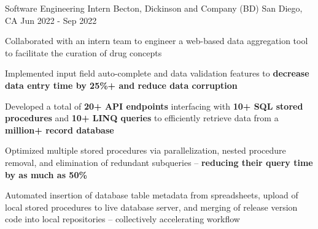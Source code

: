 

\begin{cventries}

  \cventry
  {Software Engineering Intern} %
  {Becton, Dickinson and Company (BD)} %
  {San Diego, CA} %
  {Jun 2022 - Sep 2022} %
  {\begin{cvitems} %
      \item {Collaborated with an intern team to engineer a web-based data aggregation tool to facilitate the curation of drug concepts}
      \item { Implemented input field auto-complete and data validation features to \textbf{decrease data entry time by 25\%+ and reduce data corruption} }
      \item {Developed a total of \textbf{20+ API endpoints} interfacing with \textbf{10+ SQL stored procedures} and \textbf{10+ LINQ queries} to efficiently retrieve data from a \textbf{million+ record database}}
      \item {Optimized multiple stored procedures via parallelization, nested procedure removal, and elimination of redundant subqueries -- \textbf{reducing their query time by as much as 50\%}}
      \item {Automated insertion of database table metadata from spreadsheets, upload of local stored procedures to live database server, and merging of release version code into local repositories -- collectively accelerating workflow}
    \end{cvitems}
  }


\end{cventries}
